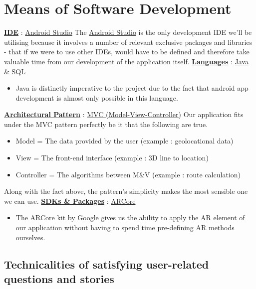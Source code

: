 
\section*{Means of Software Development}
    
    \underline{\textbf{IDE}} : \underline{Android Studio}
    \newline
    \newline
    The \underline{Android Studio} is the only development IDE we'll be utilising because it involves a number of relevant exclusive packages and libraries - that if we were to use other IDEs, would have to be defined and therefore take valuable time from our development of the application itself.
    \newline
    \newline
    \underline{\textbf{Languages}} : \underline{Java \& SQL}
    \begin{itemize}
        \item Java is distinctly imperative to the project due to the fact that android app development is almost only possible in this language.
    \end{itemize}
    \underline{\textbf{Architectural Pattern}} : \underline{MVC (Model-View-Controller)}
    \newline
    \newline
    Our application fits under the MVC pattern perfectly be it that the following are true.
    \begin{itemize}
        \item Model = The data provided by the user (example : geolocational data)
        \item View = The front-end interface (example : 3D line to location)
        \item Controller = The algorithms between M\&V (example : route calculation)
    \end{itemize}
    Along with the fact above, the pattern's simplicity makes the most sensible one we can use.
    \newline
    \newline
    \underline{\textbf{SDKs \& Packages}} : \underline{ARCore}
    \begin{itemize}
        \item The ARCore kit by Google gives us the ability to apply the AR element of our application without having to spend time pre-defining AR methods ourselves.
    \end{itemize}
    \newpage
\begin{center}
    \section*{Technicalities of satisfying user-related questions and stories}
\end{center}
